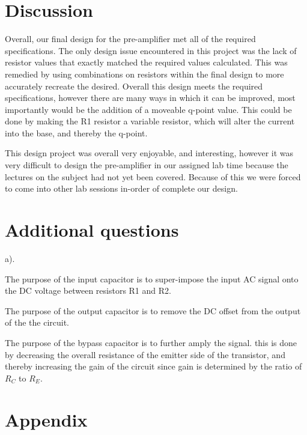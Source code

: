 \documentclass[a4paper,11pt]{article}
\begin{document}
\section{Discussion}

Overall, our final design for the pre-amplifier met all of the required specifications. The only design issue encountered in this project was the lack of resistor values that exactly matched the required values calculated. This was remedied by using combinations on resistors within the final design to more accurately recreate the desired.
Overall this design meets the required specifications, however there are many ways in which it can be improved, most importantly would be the addition of a moveable q-point value. This could be done by making the R1 resistor a variable resistor, which will alter the current into the base, and thereby the q-point. 


This design project was overall very enjoyable, and interesting, however it was very difficult to design the pre-amplifier in our assigned lab time because the lectures on the subject had not yet been covered. Because of this we were forced to come into other lab sessions in-order of complete our design.

\section{Additional questions}

a).

The purpose of the input capacitor is to super-impose the input AC signal onto the DC voltage between resistors R1 and R2. 

The purpose of the output capacitor is to remove the DC offset from the  output of the the circuit.

The purpose of the bypass capacitor is to further amply the signal. this is done by decreasing the overall resistance of the emitter side of the transistor, and thereby increasing the gain of the circuit since gain is determined by the ratio of $R_C$ to $R_E$. 

\pagebreak

\section{Appendix} 
\end{document}
